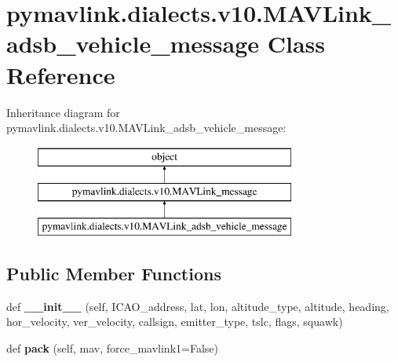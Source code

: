 \hypertarget{classpymavlink_1_1dialects_1_1v10_1_1MAVLink__adsb__vehicle__message}{}\section{pymavlink.\+dialects.\+v10.\+M\+A\+V\+Link\+\_\+adsb\+\_\+vehicle\+\_\+message Class Reference}
\label{classpymavlink_1_1dialects_1_1v10_1_1MAVLink__adsb__vehicle__message}
Inheritance diagram for pymavlink.\+dialects.\+v10.\+M\+A\+V\+Link\+\_\+adsb\+\_\+vehicle\+\_\+message\+:\begin{figure}[H]
\begin{center}
\leavevmode
\includegraphics[height=3.000000cm]{classpymavlink_1_1dialects_1_1v10_1_1MAVLink__adsb__vehicle__message}
\end{center}
\end{figure}
\subsection*{Public Member Functions}
\begin{DoxyCompactItemize}
\item 
\mbox{\label{classpymavlink_1_1dialects_1_1v10_1_1MAVLink__adsb__vehicle__message_a1a727948e6296bcfdfbb936d63a393c6}} 
def {\bfseries \+\_\+\+\_\+init\+\_\+\+\_\+} (self, I\+C\+A\+O\+\_\+address, lat, lon, altitude\+\_\+type, altitude, heading, hor\+\_\+velocity, ver\+\_\+velocity, callsign, emitter\+\_\+type, tslc, flags, squawk)
\item 
\mbox{\label{classpymavlink_1_1dialects_1_1v10_1_1MAVLink__adsb__vehicle__message_a92c6ab1ffdf5898747ba78514d7836a2}} 
def {\bfseries pack} (self, mav, force\+\_\+mavlink1=False)
\end{DoxyCompactItemize}
